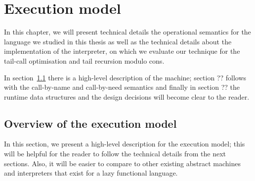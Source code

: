 \documentclass[diploma]{softlab-thesis}
\begin{document}
\chapter {Execution model}
\label{ch:execution-model}

In this chapter, we will present technical details the operational semantics for the 
language we studied in this thesis as well as the technical details about the implementation of
the interpreter, on which we evaluate our technique for the tail-call optimisation and
tail recursion modulo cons.
\newline 
\par In section~\ref{sec:execution-model-overview} there is a high-level description of the machine; section ?? follows 
with the call-by-name and call-by-need semantics and finally in section ?? the runtime data structures and the 
design decisions will become clear to the reader.

\section {Overview of the execution model}
\label{sec:execution-model-overview}

In this section, we present a high-level description for the execution model; this will be helpful for the reader
to follow the technical details from the next sections. Also, it will be easier to compare to other existing 
abstract machines and interpreters that exist for a lazy functional language.
\end{document}
